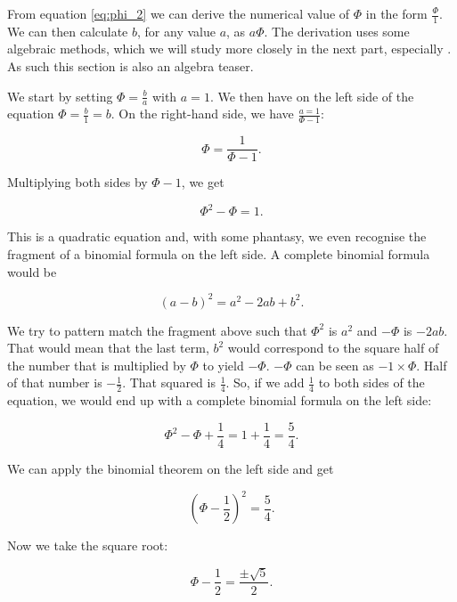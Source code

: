 \documentclass[tikz]{scrreprt}
\begin{document}
From equation \ref{eq:phi_2} we can derive
the numerical value of $\Phi$ in the form
$\frac{\Phi}{1}$.
We can then calculate $b$,
for any value $a$,
as $a\Phi$.
The derivation uses some algebraic methods,
which we will study more closely in the next part,
especially .
As such this section is also an algebra teaser.

We start by setting $\Phi = \frac{b}{a}$
with $a = 1$.
We then have on the left side of the equation
$\Phi = \frac{b}{1} = b$.
On the right-hand side, we have
$\frac{a=1}{\Phi - 1}$:

\begin{equation}
\Phi = \frac{1}{\Phi - 1}.
\end{equation}

Multiplying both sides by $\Phi - 1$,
we get 

\begin{equation}
\Phi^2 - \Phi = 1.
\end{equation}

This is a quadratic equation and,
with some phantasy, we even
recognise the fragment of a binomial formula on the
left side. A complete binomial formula would be

\begin{equation}
(a-b)^2 = a^2-2ab+b^2.
\end{equation}

We try to pattern match the fragment above
such that $\Phi^2$ is $a^2$ and $-\Phi$
is $-2ab$. That would mean that the last term,
$b^2$ would correspond to the square half of the number
that is multiplied by $\Phi$ to yield $-\Phi$.
$-\Phi$ can be seen as $-1 \times \Phi$.
Half of that number is $-\frac{1}{2}$.
That squared is $\frac{1}{4}$.
So, if we add $\frac{1}{4}$ to both sides of the equation,
we would end up with a complete binomial formula on 
the left side:

\begin{equation}
\Phi^2 - \Phi + \frac{1}{4} = 1 + \frac{1}{4} = \frac{5}{4}.
\end{equation}

We can apply the binomial theorem on the left side and get

\begin{equation}
\left(\Phi - \frac{1}{2}\right)^2 = \frac{5}{4}.
\end{equation}

Now we take the square root:

\begin{equation}
\Phi - \frac{1}{2} = \frac{\pm\sqrt{5}}{2}.
\end{equation}
\end{document}
